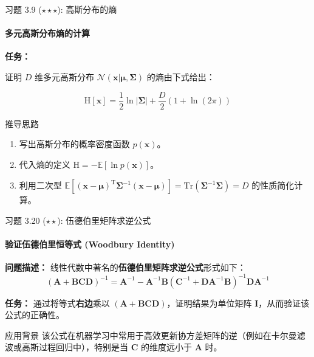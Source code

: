 \documentclass[12pt, aspectratio=169]{beamer}
\newcommand{\vect}[1]{\mathbf{#1}}
\newcommand{\mat}[1]{\mathbf{#1}}
\newcommand{\E}{\mathbb{E}}
\newcommand{\N}{\mathcal{N}}
\newcommand{\Tr}{\mathrm{Tr}}
\newcommand{\Hent}{\mathrm{H}}
\begin{document}
\begin{frame}{习题 3.9 ($\star\star\star$): 高斯分布的熵}
    \framesubtitle{多元高斯分布熵的计算}
    
    \textbf{任务：}
    
    证明 $D$ 维多元高斯分布 $\N(\vect{x}|\boldsymbol{\mu}, \boldsymbol{\Sigma})$ 的熵由下式给出：
    
    \begin{equation*}
        \Hent[\vect{x}] = \frac{1}{2} \ln |\boldsymbol{\Sigma}| + \frac{D}{2} (1 + \ln(2\pi))
    \end{equation*}
    
    \vspace{1em}
    \begin{block}{推导思路}
        \begin{enumerate}
            \item 写出高斯分布的概率密度函数 $p(\vect{x})$。
            \item 代入熵的定义 $\Hent = -\E[\ln p(\vect{x})]$。
            \item 利用二次型 $\E[(\vect{x}-\boldsymbol{\mu})^\mathrm{T}\boldsymbol{\Sigma}^{-1}(\vect{x}-\boldsymbol{\mu})] = \Tr(\boldsymbol{\Sigma}^{-1}\boldsymbol{\Sigma}) = D$ 的性质简化计算。
        \end{enumerate}
    \end{block}
\end{frame}

\begin{frame}{习题 3.20 ($\star\star$): 伍德伯里矩阵求逆公式}
    \framesubtitle{验证伍德伯里恒等式 (Woodbury Identity)}
    
    \textbf{问题描述：}
    线性代数中著名的\textbf{伍德伯里矩阵求逆公式}形式如下：
    \begin{equation*}
        (\mat{A} + \mat{B}\mat{C}\mat{D})^{-1} = \mat{A}^{-1} - \mat{A}^{-1}\mat{B}(\mat{C}^{-1} + \mat{D}\mat{A}^{-1}\mat{B})^{-1}\mat{D}\mat{A}^{-1}
    \end{equation*}
    
    \vspace{0.5em}
    \textbf{任务：}
    通过将等式\textbf{右边}乘以 $(\mat{A} + \mat{B}\mat{C}\mat{D})$，证明结果为单位矩阵 $\mat{I}$，从而验证该公式的正确性。
    
    \vspace{0.5em}
    \begin{alertblock}{应用背景}
    该公式在机器学习中常用于高效更新协方差矩阵的逆（例如在卡尔曼滤波或高斯过程回归中），特别是当 $\mat{C}$ 的维度远小于 $\mat{A}$ 时。
    \end{alertblock}
\end{frame}
\end{document}
